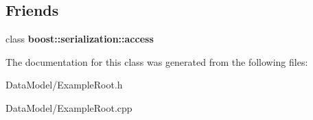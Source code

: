 \subsection*{Friends}
\begin{DoxyCompactItemize}
\item 
\hypertarget{classExampleRoot_ac98d07dd8f7b70e16ccb9a01abf56b9c}{
class {\bfseries boost::serialization::access}}
\label{classExampleRoot_ac98d07dd8f7b70e16ccb9a01abf56b9c}

\end{DoxyCompactItemize}


The documentation for this class was generated from the following files:\begin{DoxyCompactItemize}
\item 
DataModel/ExampleRoot.h\item 
DataModel/ExampleRoot.cpp\end{DoxyCompactItemize}
